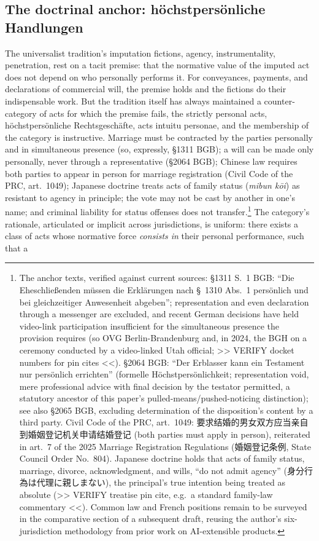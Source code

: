 \subsection{The doctrinal anchor: h\"ochstpers\"onliche Handlungen}
\label{p02:sec:synthesis-anchor}

The universalist tradition's imputation fictions, agency, instrumentality, penetration, rest on a tacit premise: that the normative value of the imputed act does not depend on who personally performs it. For conveyances, payments, and declarations of commercial will, the premise holds and the fictions do their indispensable work. But the tradition itself has always maintained a counter-category of acts for which the premise fails, the strictly personal acts, h\"ochstpers\"onliche Rechtsgesch\"afte, acts intuitu personae, and the membership of the category is instructive. Marriage must be contracted by the parties personally and in simultaneous presence (so, expressly, \S 1311 BGB); a will can be made only personally, never through a representative (\S 2064 BGB); Chinese law requires both parties to appear in person for marriage registration (Civil Code of the PRC, art.\ 1049); Japanese doctrine treats acts of family status (\textit{mibun k\=oi}) as resistant to agency in principle; the vote may not be cast by another in one's name; and criminal liability for status offenses does not transfer.\footnote{The anchor texts, verified against current sources: \S 1311 S.~1 BGB: ``Die Eheschlie{\ss}enden m{\"u}ssen die Erkl{\"a}rungen nach \S~1310 Abs.~1 pers{\"o}nlich und bei gleichzeitiger Anwesenheit abgeben''; representation and even declaration through a messenger are excluded, and recent German decisions have held video-link participation insufficient for the simultaneous presence the provision requires (so OVG Berlin-Brandenburg and, in 2024, the BGH on a ceremony conducted by a video-linked Utah official; >> VERIFY docket numbers for pin cites <<). \S 2064 BGB: ``Der Erblasser kann ein Testament nur pers{\"o}nlich errichten'' (formelle H{\"o}chstpers{\"o}nlichkeit; representation void, mere professional advice with final decision by the testator permitted, a statutory ancestor of this paper's pulled-means/pushed-noticing distinction); see also \S 2065 BGB, excluding determination of the disposition's content by a third party. Civil Code of the PRC, art.~1049: {\cjkfont 要求结婚的男女双方应当亲自到婚姻登记机关申请结婚登记} (both parties must apply in person), reiterated in art.~7 of the 2025 Marriage Registration Regulations ({\cjkfont 婚姻登记条例}, State Council Order No.~804). Japanese doctrine holds that acts of family status, marriage, divorce, acknowledgment, and wills, ``do not admit agency'' ({\cjkfont 身分行為は代理に親しまない}), the principal's true intention being treated as absolute (>> VERIFY treatise pin cite, e.g.\ a standard family-law commentary <<). Common law and French positions remain to be surveyed in the comparative section of a subsequent draft, reusing the author's six-jurisdiction methodology from prior work on AI-extensible products.} The category's rationale, articulated or implicit across jurisdictions, is uniform: there exists a class of acts whose normative force \emph{consists in} their personal performance, such that a 